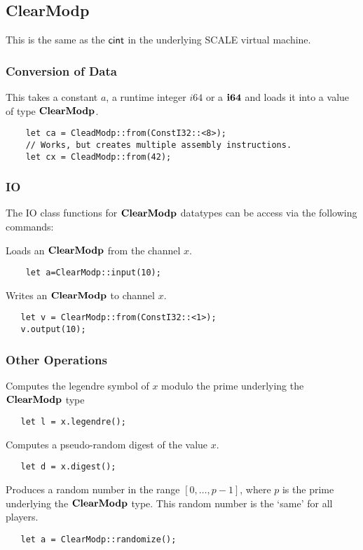 \subsection{ClearModp}
This is the same as the $\mathsf{cint}$ in the underlying SCALE virtual machine.

\subsubsection{Conversion of Data}
This takes a constant $a$, a runtime integer $i64$ or a $\mathbf{i64}$
and loads it into a value of type $\mathbf{ClearModp}$.
\begin{lstlisting}
    let ca = CleadModp::from(ConstI32::<8>);
    // Works, but creates multiple assembly instructions.
    let cx = CleadModp::from(42);
\end{lstlisting}


\subsubsection{IO}
The IO class functions for $\mathbf{ClearModp}$ datatypes can be access via the following commands:

Loads an $\mathbf{ClearModp}$ from the channel $x$.
\begin{lstlisting}
    let a=ClearModp::input(10);
\end{lstlisting}

Writes an $\mathbf{ClearModp}$ to channel $x$.
\begin{lstlisting}
   let v = ClearModp::from(ConstI32::<1>);
   v.output(10);
\end{lstlisting}


\subsubsection{Other Operations}

Computes the legendre symbol of $x$ modulo the prime underlying the
$\mathbf{ClearModp}$ type
\begin{lstlisting}
   let l = x.legendre();
\end{lstlisting}


Computes a pseudo-random digest of the value $x$.
\begin{lstlisting}
   let d = x.digest();
\end{lstlisting}


Produces a random number in the range $[0,\ldots,p-1]$,
where $p$ is the prime underlying the $\mathbf{ClearModp}$ type.
This random number is the `same' for all players.
\begin{lstlisting}
   let a = ClearModp::randomize();
\end{lstlisting}



